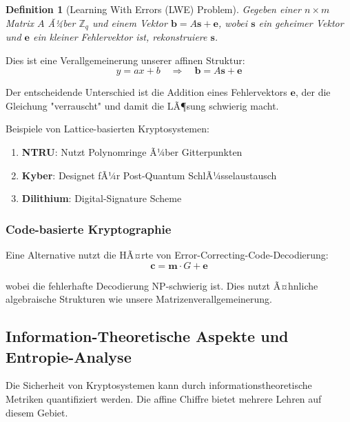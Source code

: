 ﻿\documentclass[12pt,a4paper]{article}
\newtheorem{definition}{Definition}
\begin{document}
	\begin{definition}[Learning With Errors (LWE) Problem]
		Gegeben einer $n \times m$ Matrix $A$ Ã¼ber $\mathbb{Z}_q$ und einem Vektor $\mathbf{b} = A\mathbf{s} + \mathbf{e}$, wobei $\mathbf{s}$ ein geheimer Vektor und $\mathbf{e}$ ein kleiner Fehlervektor ist, rekonstruiere $\mathbf{s}$.
	\end{definition}
	
	Dies ist eine Verallgemeinerung unserer affinen Struktur:
	\begin{equation}
		y = ax + b \quad \Rightarrow \quad \mathbf{b} = A\mathbf{s} + \mathbf{e}
	\end{equation}
	
	Der entscheidende Unterschied ist die Addition eines Fehlervektors $\mathbf{e}$, der die Gleichung "verrauscht" und damit die LÃ¶sung schwierig macht.
	
	Beispiele von Lattice-basierten Kryptosystemen:
	\begin{enumerate}
		\item \textbf{NTRU}: Nutzt Polynomringe Ã¼ber Gitterpunkten
		\item \textbf{Kyber}: Designet fÃ¼r Post-Quantum SchlÃ¼sselaustausch
		\item \textbf{Dilithium}: Digital-Signature Scheme
	\end{enumerate}
	
	\subsubsection{Code-basierte Kryptographie}
	
	Eine Alternative nutzt die HÃ¤rte von Error-Correcting-Code-Decodierung:
	\begin{equation}
		\mathbf{c} = \mathbf{m} \cdot G + \mathbf{e}
	\end{equation}
	
	wobei die fehlerhafte Decodierung NP-schwierig ist. Dies nutzt Ã¤hnliche algebraische Strukturen wie unsere Matrizenverallgemeinerung.
	
	
	\subsection{Information-Theoretische Aspekte und Entropie-Analyse}
	
	Die Sicherheit von Kryptosystemen kann durch informationstheoretische Metriken quantifiziert werden. Die affine Chiffre bietet mehrere Lehren auf diesem Gebiet.
	
\end{document}
